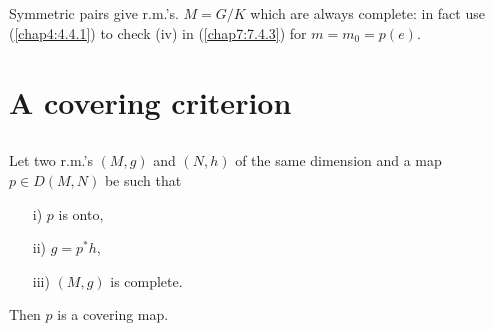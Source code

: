 \setcounter{subsection}{11}
\subsection{}\label{chap7:7.4.12}
Symmetric pairs give r.m.'s. $M=G/K$ which are always complete: in
fact use (\ref{chap4:4.4.1}) to check (iv) in (\ref{chap7:7.4.3}) for
$m=m_{0}=p(e)$. 

\section{A covering criterion}\label{chap7:chap7-sec5}

\subsection{}\label{chap7:7.5.1}

\begin{prop*}
Let two r.m.'s $(M,g)$ and $(N,h)$ of the same dimension and a map
$p\in D(M,N)$ be such that
\begin{itemize}
\item[\rm i)] $p$ is onto,

\item[\rm ii)] $g=p^{\ast}h$,

\item[\rm iii)] $(M,g)$ is complete.
\end{itemize}
Then $p$ is a covering map.
\end{prop*}

